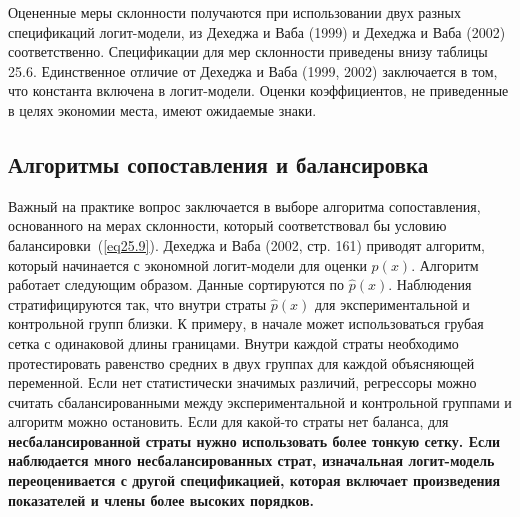 Оцененные меры склонности получаются при использовании двух разных спецификаций логит-модели, из Дехеджа и Ваба (1999) и Дехеджа и Ваба (2002) соответственно. Спецификации для мер склонности приведены внизу таблицы 25.6. Единственное отличие от Дехеджа и Ваба (1999, 2002) заключается в том, что константа включена в логит-модели. Оценки коэффициентов, не приведенные в целях экономии места, имеют ожидаемые знаки. 

\subsection*{Алгоритмы сопоставления и балансировка}

Важный на практике вопрос заключается в выборе алгоритма сопоставления, основанного на мерах склонности, который соответствовал бы условию балансировки~(\ref{eq25.9}). Дехеджа и Ваба (2002, стр. 161) приводят алгоритм, который начинается с экономной логит-модели для оценки $p(x)$. Алгоритм работает следующим образом. Данные сортируются по $\widehat p(x)$. Наблюдения стратифицируются так, что внутри страты $\widehat p(x)$ для экспериментальной и контрольной групп близки. К примеру, в начале может использоваться грубая сетка с одинаковой длины границами. Внутри каждой страты необходимо протестировать равенство средних в двух группах для каждой объясняющей переменной. Если нет статистически значимых различий, регрессоры можно считать сбалансированными между экспериментальной и контрольной группами и алгоритм можно остановить. Если для какой-то страты нет баланса, для \bfseries несбалансированной страты \mdseries нужно использовать более тонкую сетку. Если наблюдается много несбалансированных страт, изначальная логит-модель переоценивается с другой спецификацией, которая включает произведения показателей и члены более высоких порядков. 

